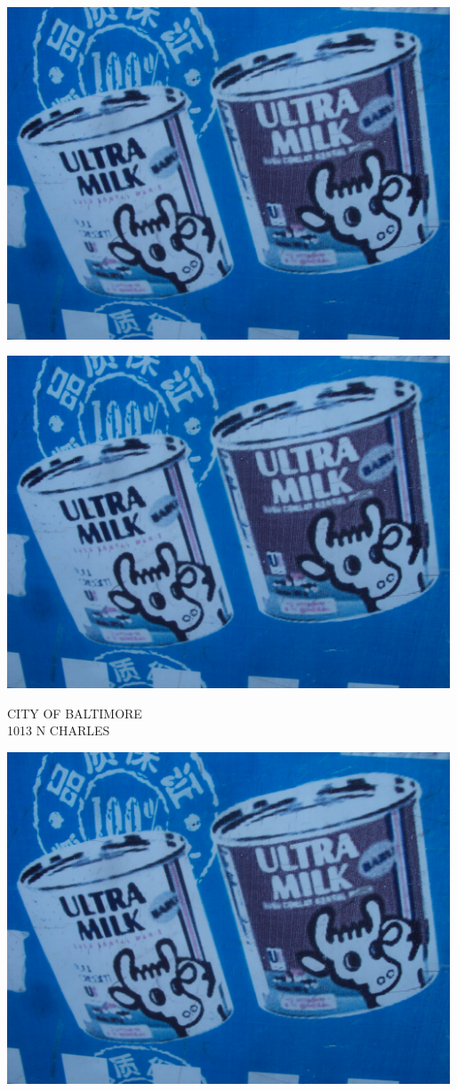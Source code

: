 \documentclass[10pt,letterpaper]{article}
\begin{document}
\includegraphics[width=5.19in]{landscape.jpg}

\vspace{0.25in}
\includegraphics[width=5.19in]{landscape.jpg}

CITY OF BALTIMORE\\
1013 N CHARLES\\
\pagebreak

\includegraphics[width=5.19in]{landscape.jpg}
\end{document}
